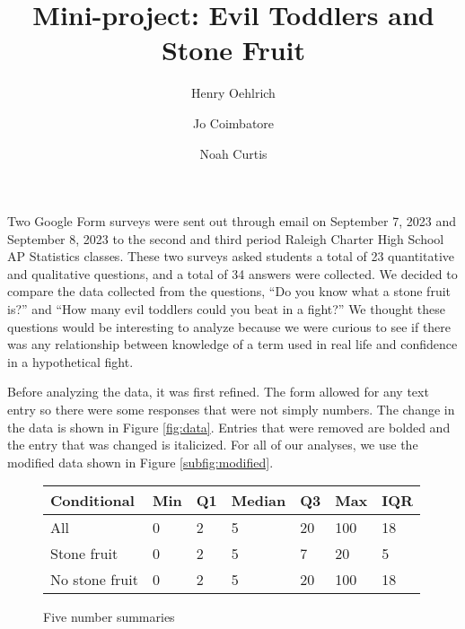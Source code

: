 \documentclass{article}
\title{Mini-project: Evil Toddlers and Stone Fruit}
\author{Henry Oehlrich \and Jo Coimbatore \and Noah Curtis}
\begin{document}
\maketitle

Two Google Form surveys were sent out through email on September 7, 2023 and
September 8, 2023 to the second and third period Raleigh Charter High School AP
Statistics classes. These two surveys asked students a total of 23 quantitative
and qualitative questions, and a total of 34 answers were collected. We decided
to compare the data collected from the questions, “Do you know what a stone
fruit is?” and “How many evil toddlers could you beat in a fight?” We thought
these questions would be interesting to analyze because we were curious to see
if there was any relationship between knowledge of a term used in real life and
confidence in a hypothetical fight.

Before analyzing the data, it was first refined. The form allowed for any text
entry so there were some responses that were not simply numbers. The change in
the data is shown in Figure \ref{fig:data}. Entries that were removed are
bolded and the entry that was changed is italicized. For all of our analyses,
we use the modified data shown in Figure \ref{subfig:modified}.

\begin{figure}[ht]
    \centering
    \caption{Five number summaries}
    \label{fig:fivenum}
    \begin{tabular}{l|l|l|l|l|l|l}
        \toprule
        Conditional & Min & Q1 & Median & Q3 & Max & IQR \\
        \midrule
        All & 0 & 2 & 5 & 20 & 100 & 18 \\
        Stone fruit & 0 & 2 & 5 & 7 & 20 & 5 \\
        No stone fruit & 0 & 2 & 5 & 20 & 100 & 18 \\
    \end{tabular}
\end{figure}
\end{document}
